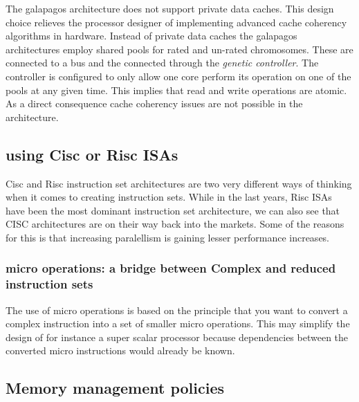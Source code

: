The galapagos architecture does not support private data caches. This design choice relieves the processor designer of implementing advanced cache coherency algorithms in hardware. Instead of private data caches the galapagos architectures employ shared pools for rated and un-rated chromosomes. These are connected to a bus and the connected through the \emph{genetic controller}. The controller is configured to only allow one core perform its operation on one of the pools at any given time. This implies that read and write operations are atomic. As a direct consequence cache coherency issues are not possible in the architecture. 




\subsection{using Cisc or Risc ISAs}
Cisc and Risc instruction set architectures are two very different ways of thinking when it comes to creating instruction sets.
While in the last years, Risc ISAs have been the most dominant instruction set architecture, we can also see that CISC architectures
are on their way back into the markets. Some of the reasons for this is that increasing paralellism is gaining lesser performance increases.

\subsubsection{micro operations: a bridge between Complex and reduced instruction sets}
The use of micro operations is based on the principle that you want to convert a complex instruction into a set of smaller micro operations. This
may simplify the design of for instance a super scalar processor because dependencies between the converted micro instructions would already be known. 


\subsection{Memory management policies}

\section{}
